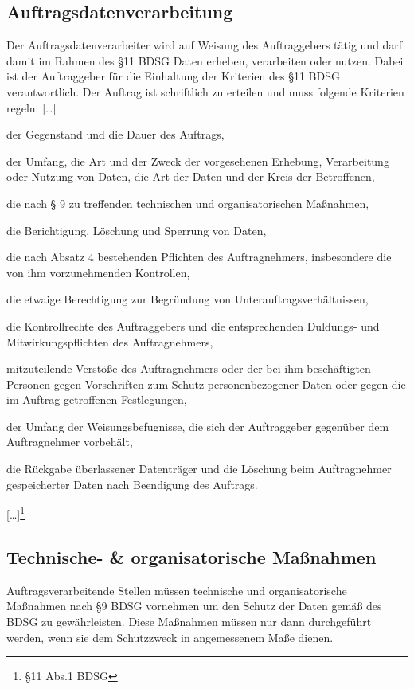 \subsection{Auftragsdatenverarbeitung}
Der Auftragsdatenverarbeiter wird auf Weisung des Auftraggebers t\"atig und darf damit im Rahmen des §11 BDSG Daten erheben, verarbeiten oder nutzen. Dabei ist der Auftraggeber f\"ur die Einhaltung der Kriterien des §11 BDSG verantwortlich. Der Auftrag ist schriftlich zu erteilen und muss folgende Kriterien regeln:{\glqq} […]
 \begin{seList}                            

\item[1.] der Gegenstand und die Dauer des Auftrags,
\item[2.] der Umfang, die Art und der Zweck der vorgesehenen Erhebung, Verarbeitung oder Nutzung von Daten, die Art der Daten und der Kreis der Betroffenen,
\item[3.] die nach § 9 zu treffenden technischen und organisatorischen Ma{\ss}nahmen,
\item[4.] die Berichtigung, L\"oschung und Sperrung von Daten,
\item[5.] die nach Absatz 4 bestehenden Pflichten des Auftragnehmers, insbesondere die von ihm vorzunehmenden Kontrollen,
\item[6.] die etwaige Berechtigung zur Begr\"undung von Unterauftragsverh\"altnissen,
\item[7.] die Kontrollrechte des Auftraggebers und die entsprechenden Duldungs- und Mitwirkungspflichten des Auftragnehmers,
\item[8.] mitzuteilende Verst\"o{\ss}e des Auftragnehmers oder der bei ihm besch\"aftigten Personen gegen Vorschriften zum Schutz personenbezogener Daten oder gegen die im Auftrag getroffenen Festlegungen,
\item[9.] der Umfang der Weisungsbefugnisse, die sich der Auftraggeber gegen\"uber dem Auftragnehmer vorbeh\"alt,
\item[10.] die R\"uckgabe \"uberlassener Datentr\"ager und die L\"oschung beim Auftragnehmer gespeicherter Daten nach Beendigung des Auftrags. 
\end{seList}

[…]{\grqq}\footnote{§11 Abs.1 BDSG}
 \label{auftragsdatenverarbeitung}
\subsection{Technische- \& organisatorische Ma{\ss}nahmen}
Auftragsverarbeitende Stellen m\"ussen technische und organisatorische Ma{\ss}nahmen nach §9 BDSG vornehmen um den Schutz der Daten gem\"a{\ss} des BDSG zu gew\"ahrleisten. Diese Ma{\ss}nahmen m\"ussen nur dann durchgef\"uhrt werden, wenn sie dem Schutzzweck in angemessenem Ma{\ss}e dienen.\newline

